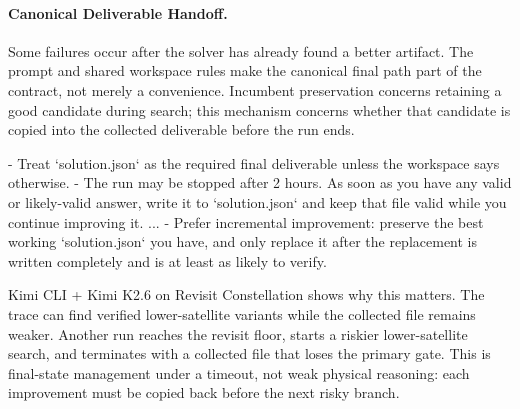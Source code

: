 \documentclass[11pt]{article}
\newenvironment{promptblock}
  {\VerbatimEnvironment\par\smallskip\Needspace{10\baselineskip}\noindent\begin{promptblockinner}}
  {\end{promptblockinner}\par\smallskip}
\begin{document}
\paragraph{Canonical Deliverable Handoff.} Some failures occur after the solver has already found a better artifact. The prompt and shared workspace rules make the canonical final path part of the contract, not merely a convenience. Incumbent preservation concerns retaining a good candidate during search; this mechanism concerns whether that candidate is copied into the collected deliverable before the run ends.
\begin{promptblock}
- Treat `solution.json` as the required final deliverable unless the workspace
  says otherwise.
- The run may be stopped after 2 hours. As soon as you have any valid or
  likely-valid answer, write it to `solution.json` and keep that file valid
  while you continue improving it.
...
- Prefer incremental improvement: preserve the best working `solution.json`
  you have, and only replace it after the replacement is written completely
  and is at least as likely to verify.
\end{promptblock}
Kimi CLI + Kimi K2.6 on Revisit Constellation shows why this matters. The trace can find verified lower-satellite variants while the collected file remains weaker. Another run reaches the revisit floor, starts a riskier lower-satellite search, and terminates with a collected file that loses the primary gate. This is final-state management under a timeout, not weak physical reasoning: each improvement must be copied back before the next risky branch.
\end{document}
